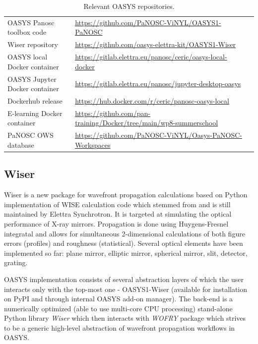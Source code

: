\documentclass[11pt, a4paper]{article}
\begin{document}
\begin{table}[ht]
  \label{tab:repos}
  \centering
  \begin{center}
    \caption{Relevant OASYS repositories.}
    \begin{tabular}{l p{10cm}l}
      \hline
      OASYS Panosc toolbox code & \url{https://github.com/PaNOSC-ViNYL/OASYS1-PaNOSC} \\
      Wiser repository & \url{https://github.com/oasys-elettra-kit/OASYS1-Wiser} \\
      OASYS local Docker container & \url{https://gitlab.elettra.eu/panosc/ceric/oasys-local-docker} \\
      OASYS Jupyter Docker container & \url{https://gitlab.elettra.eu/panosc/jupyter-desktop-oasys} \\
      Dockerhub release & \url{https://hub.docker.com/r/ceric/panosc-oasys-local}\\
      E-learning Docker container & \url{https://github.com/pan-training/Docker/tree/main/wp8-summerschool} \\
      PaNOSC OWS database & \url{https://github.com/PaNOSC-ViNYL/Oasys-PaNOSC-Workspaces} \\
      \hline
    \end{tabular}
  \end{center}
\end{table}

\subsection{Wiser}

Wiser is a new package for wavefront propagation calculations based on Python implementation of WISE calculation code which stemmed from and is still maintained by Elettra Synchrotron. It is targeted at simulating the optical performance of X-ray mirrors. Propagation is done using Huygens-Fresnel integratal and allows for simultaneous 2-dimensional calculations of both figure errors (profiles) and roughness (statistical). Several optical elements have been implemented so far: plane mirror, elliptic mirror, spherical mirror, slit, detector, grating.

OASYS implementation consists of several abstraction layers of which the user interacts only with the top-most one - OASYS1-Wiser (available for installation on PyPI and through internal OASYS add-on manager). The back-end is a numerically optimized (able to use multi-core CPU processing) stand-alone Python library \emph{Wiser} which then interacts with \emph{WOFRY} package which strives to be a generic high-level abstraction of wavefront propagation workflows in OASYS. 
\end{document}

